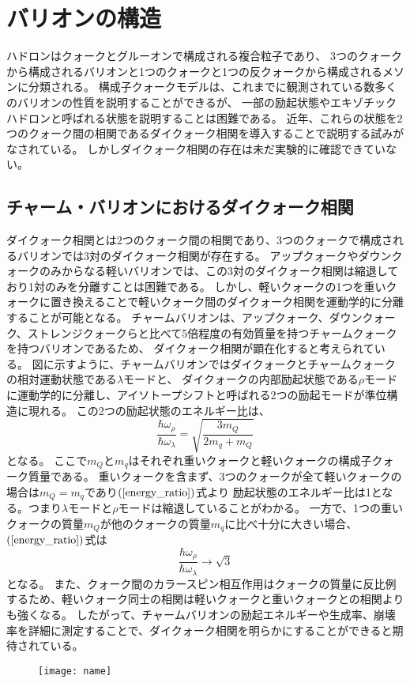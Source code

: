 \section{バリオンの構造}
ハドロンはクォークとグルーオンで構成される複合粒子であり、
3つのクォークから構成されるバリオンと1つのクォークと1つの反クォークから構成されるメソンに分類される。
構成子クォークモデルは、これまでに観測されている数多くのバリオンの性質を説明することができるが、
一部の励起状態やエキゾチックハドロンと呼ばれる状態を説明することは困難である。
近年、これらの状態を2つのクォーク間の相関であるダイクォーク相関を導入することで説明する試みがなされている\cite{ref1}。
しかしダイクォーク相関の存在は未だ実験的に確認できていない。

\subsection{チャーム・バリオンにおけるダイクォーク相関}
ダイクォーク相関とは2つのクォーク間の相関であり、3つのクォークで構成されるバリオンでは3対のダイクォーク相関が存在する。
アップクォークやダウンクォークのみからなる軽いバリオンでは、この3対のダイクォーク相関は縮退しており1対のみを分離すことは困難である。
しかし、軽いクォークの1つを重いクォークに置き換えることで軽いクォーク間のダイクォーク相関を運動学的に分離することが可能となる。
チャームバリオンは、アップクォーク、ダウンクォーク、ストレンジクォークらと比べて5倍程度の有効質量を持つチャームクォークを持つバリオンであるため、
ダイクォーク相関が顕在化すると考えられている。
図に示すように、チャームバリオンではダイクォークとチャームクォークの相対運動状態である$\lambda$モードと、
ダイクォークの内部励起状態である$\rho$モードに運動学的に分離し、アイソトープシフトと呼ばれる2つの励起モードが準位構造に現れる。
この2つの励起状態のエネルギー比は、
\begin{equation}
  \label{energy_ratio}
  \frac{\hbar\omega_{\rho}}{\hbar\omega_{\lambda}}=\sqrt{\frac{3m_{Q}}{2m_{q}+m_{Q}}}
\end{equation}
となる。
ここで$m_Q$と$m_q$はそれぞれ重いクォークと軽いクォークの構成子クォーク質量である。
重いクォークを含まず、3つのクォークが全て軽いクォークの場合は$m_Q=m_q$であり$(\ref{energy_ratio})$式より
励起状態のエネルギー比は1となる。つまり$\lambda$モードと$\rho$モードは縮退していることがわかる。
一方で、1つの重いクォークの質量$m_Q$が他のクォークの質量$m_q$に比べ十分に大きい場合、$(\ref{energy_ratio})$式は
\begin{equation}
  \label{energy_ratio2}
  \frac{\hbar\omega_{\rho}}{\hbar\omega_{\lambda}}\longrightarrow\sqrt{3}
\end{equation}
となる。
また、クォーク間のカラースピン相互作用はクォークの質量に反比例するため、軽いクォーク同士の相関は軽いクォークと重いクォークとの相関よりも強くなる。
したがって、チャームバリオンの励起エネルギーや生成率、崩壊率を詳細に測定することで、ダイクォーク相関を明らかにすることができると期待されている。

\begin{figure}
  \centering
  \texttt{[image: name]}
\end{figure}